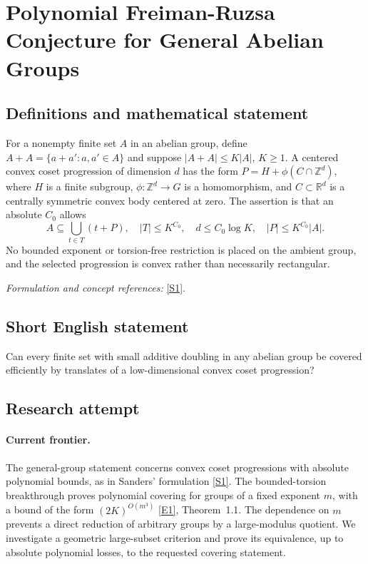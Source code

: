 \documentclass[11pt,a4paper]{article}
\newcommand{\Z}{\mathbb{Z}}
\newcommand{\R}{\mathbb{R}}
\newcommand{\sref}[2]{\hyperlink{source:#1:#2}{[S#2]}}
\newcommand{\eref}[2]{\hyperlink{extra:#1:#2}{[E#2]}}
\newif\ifshowcatalogue
\newcommand{\cataloguescope}[1]{\ifshowcatalogue
 \paragraph{Exact scope in the supplied catalogue.}
 \begin{quote}\small #1\end{quote}\fi}
\numberwithin{equation}{section}
\begin{document}
\setcounter{section}{0}
\clearpage
\section*{\texorpdfstring{Polynomial Freiman-Ruzsa Conjecture for General Abelian Groups}{Polynomial Freiman-Ruzsa Conjecture for General Abelian Groups}}\label{statement}
\subsection{Definitions and mathematical statement}
For a nonempty finite set $A$ in an abelian group, define $A+A=\{a+a':a,a'\in A\}$ and suppose $|A+A|\le K|A|$, $K\ge1$. A centered convex coset progression of dimension $d$ has the form
$P=H+\phi(C\cap\Z^d)$, where $H$ is a finite subgroup, $\phi:\Z^d\to G$ is a homomorphism, and $C\subset\R^d$ is a centrally symmetric convex body centered at zero. The assertion is that an absolute $C_0$ allows
\[
 A\subseteq\bigcup_{t\in T}(t+P),\quad |T|\le K^{C_0},
 \quad d\le C_0\log K,\quad |P|\le K^{C_0}|A|.
\]
No bounded exponent or torsion-free restriction is placed on the ambient group, and the selected progression is convex rather than necessarily rectangular.
\par\smallskip\textit{Formulation and concept references:} \sref{statement}{1}.
\cataloguescope{Prove that there is an absolute constant C such that for every finite subset A of an arbitrary abelian group with |A+A| <= K|A|, the set A can be covered by exp(C log K) translates of a centred convex coset progression of dimension at most C log K and size at most exp(C log K)|A|.}
\subsection{Short English statement}
Can every finite set with small additive doubling in any abelian group be covered efficiently by translates of a low-dimensional convex coset progression?
\subsection{Research attempt}

\paragraph{Current frontier.}
The general-group statement concerns convex coset progressions with absolute polynomial bounds, as in Sanders' formulation \sref{statement}{1}. The bounded-torsion breakthrough proves polynomial covering for groups of a fixed exponent $m$, with a bound of the form $(2K)^{O(m^3)}$ \eref{statement}{1}, Theorem~1.1. The dependence on $m$ prevents a direct reduction of arbitrary groups by a large-modulus quotient. We investigate a geometric large-subset criterion and prove its equivalence, up to absolute polynomial losses, to the requested covering statement.
\end{document}
